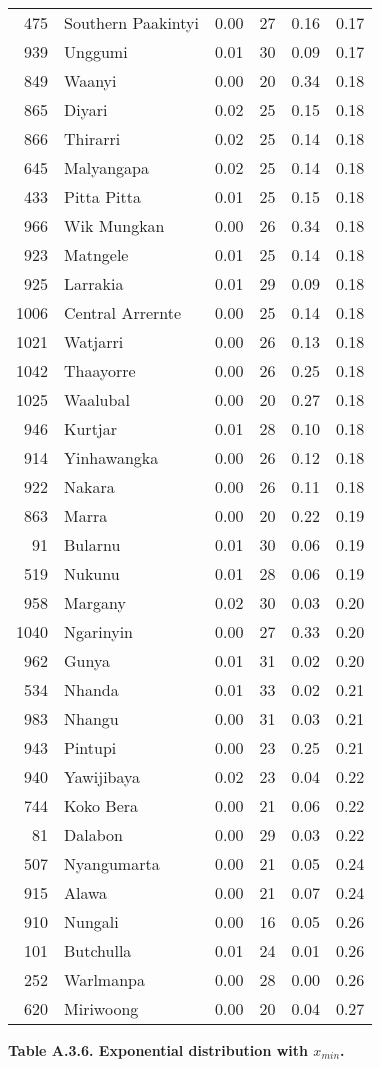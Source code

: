 \begin{longtable}[]{@{}rlrrrr@{}}
475 & Southern Paakintyi & 0.00 & 27 & 0.16 & 0.17\tabularnewline
939 & Unggumi & 0.01 & 30 & 0.09 & 0.17\tabularnewline
849 & Waanyi & 0.00 & 20 & 0.34 & 0.18\tabularnewline
865 & Diyari & 0.02 & 25 & 0.15 & 0.18\tabularnewline
866 & Thirarri & 0.02 & 25 & 0.14 & 0.18\tabularnewline
645 & Malyangapa & 0.02 & 25 & 0.14 & 0.18\tabularnewline
433 & Pitta Pitta & 0.01 & 25 & 0.15 & 0.18\tabularnewline
966 & Wik Mungkan & 0.00 & 26 & 0.34 & 0.18\tabularnewline
923 & Matngele & 0.01 & 25 & 0.14 & 0.18\tabularnewline
925 & Larrakia & 0.01 & 29 & 0.09 & 0.18\tabularnewline
1006 & Central Arrernte & 0.00 & 25 & 0.14 & 0.18\tabularnewline
1021 & Watjarri & 0.00 & 26 & 0.13 & 0.18\tabularnewline
1042 & Thaayorre & 0.00 & 26 & 0.25 & 0.18\tabularnewline
1025 & Waalubal & 0.00 & 20 & 0.27 & 0.18\tabularnewline
946 & Kurtjar & 0.01 & 28 & 0.10 & 0.18\tabularnewline
914 & Yinhawangka & 0.00 & 26 & 0.12 & 0.18\tabularnewline
922 & Nakara & 0.00 & 26 & 0.11 & 0.18\tabularnewline
863 & Marra & 0.00 & 20 & 0.22 & 0.19\tabularnewline
91 & Bularnu & 0.01 & 30 & 0.06 & 0.19\tabularnewline
519 & Nukunu & 0.01 & 28 & 0.06 & 0.19\tabularnewline
958 & Margany & 0.02 & 30 & 0.03 & 0.20\tabularnewline
1040 & Ngarinyin & 0.00 & 27 & 0.33 & 0.20\tabularnewline
962 & Gunya & 0.01 & 31 & 0.02 & 0.20\tabularnewline
534 & Nhanda & 0.01 & 33 & 0.02 & 0.21\tabularnewline
983 & Nhangu & 0.00 & 31 & 0.03 & 0.21\tabularnewline
943 & Pintupi & 0.00 & 23 & 0.25 & 0.21\tabularnewline
940 & Yawijibaya & 0.02 & 23 & 0.04 & 0.22\tabularnewline
744 & Koko Bera & 0.00 & 21 & 0.06 & 0.22\tabularnewline
81 & Dalabon & 0.00 & 29 & 0.03 & 0.22\tabularnewline
507 & Nyangumarta & 0.00 & 21 & 0.05 & 0.24\tabularnewline
915 & Alawa & 0.00 & 21 & 0.07 & 0.24\tabularnewline
910 & Nungali & 0.00 & 16 & 0.05 & 0.26\tabularnewline
101 & Butchulla & 0.01 & 24 & 0.01 & 0.26\tabularnewline
252 & Warlmanpa & 0.00 & 28 & 0.00 & 0.26\tabularnewline
620 & Miriwoong & 0.00 & 20 & 0.04 & 0.27\tabularnewline
\bottomrule
\end{longtable}

\newpage

\textbf{Table A.3.6. Exponential distribution with \(x_{min}\).}

